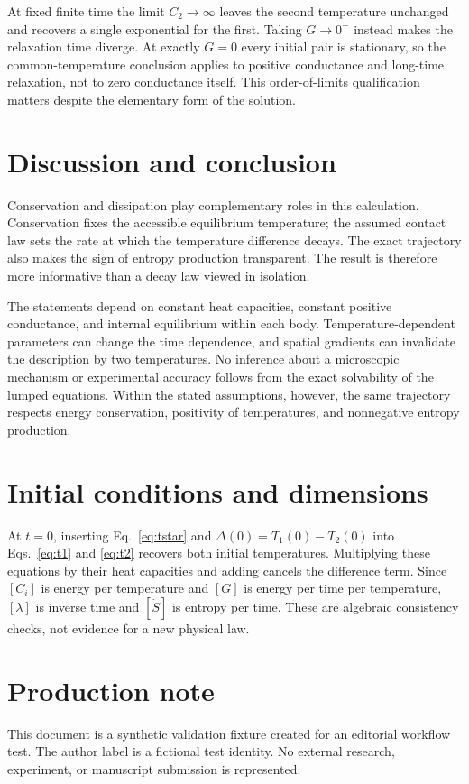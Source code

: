 \documentclass[aps,prx,reprint,groupedaddress]{revtex4-2}
\begin{document}
At fixed finite time the limit $C_2\to\infty$ leaves the second temperature unchanged and recovers a single exponential for the first. Taking $G\to0^+$ instead makes the relaxation time diverge. At exactly $G=0$ every initial pair is stationary, so the common-temperature conclusion applies to positive conductance and long-time relaxation, not to zero conductance itself. This order-of-limits qualification matters despite the elementary form of the solution.

\section{Discussion and conclusion}
Conservation and dissipation play complementary roles in this calculation. Conservation fixes the accessible equilibrium temperature; the assumed contact law sets the rate at which the temperature difference decays. The exact trajectory also makes the sign of entropy production transparent. The result is therefore more informative than a decay law viewed in isolation.

The statements depend on constant heat capacities, constant positive conductance, and internal equilibrium within each body. Temperature-dependent parameters can change the time dependence, and spatial gradients can invalidate the description by two temperatures. No inference about a microscopic mechanism or experimental accuracy follows from the exact solvability of the lumped equations. Within the stated assumptions, however, the same trajectory respects energy conservation, positivity of temperatures, and nonnegative entropy production.

\appendix
\section{Initial conditions and dimensions}\label{app:checks}
At $t=0$, inserting Eq.~\eqref{eq:tstar} and $\Delta(0)=T_1(0)-T_2(0)$ into Eqs.~\eqref{eq:t1} and \eqref{eq:t2} recovers both initial temperatures. Multiplying these equations by their heat capacities and adding cancels the difference term. Since $[C_i]$ is energy per temperature and $[G]$ is energy per time per temperature, $[\lambda]$ is inverse time and $[\dot S]$ is entropy per time. These are algebraic consistency checks, not evidence for a new physical law.

\section*{Production note}
This document is a synthetic validation fixture created for an editorial workflow test. The author label is a fictional test identity. No external research, experiment, or manuscript submission is represented.

\end{document}

